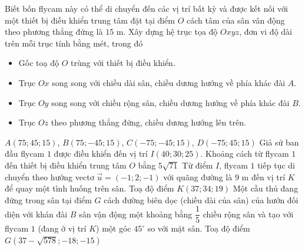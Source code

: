 \begin{ex}
\begin{center}
 \end{center}Biết bốn flycam này có thể di chuyển đến các vị trí bất kỳ và được kết nối với một thiết bị điều khiển trung tâm đặt tại điểm $O$ cách tâm của sân vân động theo phương thẳng đứng là $15$ m. Xây dựng hệ trục tọa độ $Oxyz$, đơn vi độ dài trên mỗi trục tính bằng mét, trong đó
 	\begin{itemize}
 		\item Gốc toạ độ $O$ trùng với thiết bị điều khiển.
 		\item Trục $Ox$ song song với chiều dài sân, chiều dương hướng về phía khác đài $A$.
 		\item Trục $Oy$ song song với chiều rộng sân, chiều dương hướng về phía khác đài $B$.
 		\item Trục $Oz$ theo phương thẳng đứng, chiều dương hướng lên trên.
 	\end{itemize}
 	\choiceTF
 	{\True $A(75 ; 45 ; 15)$, $B(75 ;-45 ; 15)$, $C(-75 ;-45 ; 15)$, $D(-75 ; 45 ; 15)$}
 	{Giả sử ban đầu flycam $1$ được điều khiển đến vị trí $I(40;30;25)$. Khoảng cách từ flycam $1$ đến thiết bị điều khiển trung tâm $O$ bằng $5\sqrt{71}$}
 	{Từ điểm $I$, flycam $1$ tiếp tục di chuyển theo hướng vectơ $\overrightarrow{u}=\left(-1;2;-1\right)$ với quãng đường là $9$ m đến vị trí $K$ để quay một tình huống trên sân. Toạ độ điểm $K(37;34;19)$}
 	{Một cầu thủ đang đứng trong sân tại điểm $G$ cách đường biên dọc (chiều dài của sân) của hướn đối diện với khán đài $B$ sân vận động một khoảng bằng $\dfrac{1}{5}$ chiều rộng sân và tạo với flycam $1$ (đang ở vị trí $K$) một góc $45^{\circ}$ so với mặt sân. Toạ độ điểm $G\left(37-\sqrt{578};-18;-15\right)$}
\end{ex}

